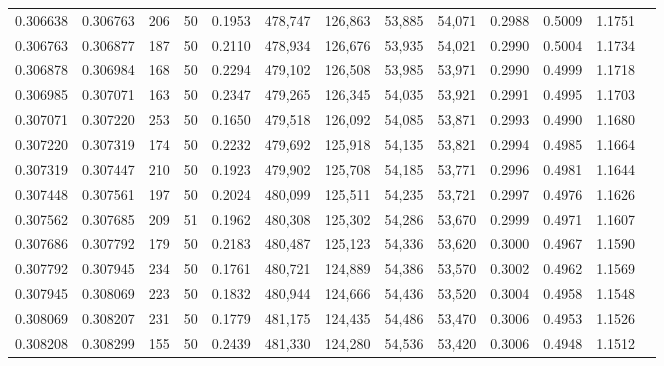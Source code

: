 \begin{tabular}{rrrrrrrrrrrrr}
0.306638 & 0.306763 &   206 &  50 &                                     0.1953 & 478,747 & 126,863 &  53,885 &  54,071 & 0.2988 & 0.5009 & 1.1751 \\
0.306763 & 0.306877 &   187 &  50 &                                     0.2110 & 478,934 & 126,676 &  53,935 &  54,021 & 0.2990 & 0.5004 & 1.1734 \\
0.306878 & 0.306984 &   168 &  50 &                                     0.2294 & 479,102 & 126,508 &  53,985 &  53,971 & 0.2990 & 0.4999 & 1.1718 \\
0.306985 & 0.307071 &   163 &  50 &                                     0.2347 & 479,265 & 126,345 &  54,035 &  53,921 & 0.2991 & 0.4995 & 1.1703 \\
0.307071 & 0.307220 &   253 &  50 &                                     0.1650 & 479,518 & 126,092 &  54,085 &  53,871 & 0.2993 & 0.4990 & 1.1680 \\
0.307220 & 0.307319 &   174 &  50 &                                     0.2232 & 479,692 & 125,918 &  54,135 &  53,821 & 0.2994 & 0.4985 & 1.1664 \\
0.307319 & 0.307447 &   210 &  50 &                                     0.1923 & 479,902 & 125,708 &  54,185 &  53,771 & 0.2996 & 0.4981 & 1.1644 \\
0.307448 & 0.307561 &   197 &  50 &                                     0.2024 & 480,099 & 125,511 &  54,235 &  53,721 & 0.2997 & 0.4976 & 1.1626 \\
0.307562 & 0.307685 &   209 &  51 &                                     0.1962 & 480,308 & 125,302 &  54,286 &  53,670 & 0.2999 & 0.4971 & 1.1607 \\
0.307686 & 0.307792 &   179 &  50 &                                     0.2183 & 480,487 & 125,123 &  54,336 &  53,620 & 0.3000 & 0.4967 & 1.1590 \\
0.307792 & 0.307945 &   234 &  50 &                                     0.1761 & 480,721 & 124,889 &  54,386 &  53,570 & 0.3002 & 0.4962 & 1.1569 \\
0.307945 & 0.308069 &   223 &  50 &                                     0.1832 & 480,944 & 124,666 &  54,436 &  53,520 & 0.3004 & 0.4958 & 1.1548 \\
0.308069 & 0.308207 &   231 &  50 &                                     0.1779 & 481,175 & 124,435 &  54,486 &  53,470 & 0.3006 & 0.4953 & 1.1526 \\
0.308208 & 0.308299 &   155 &  50 &                                     0.2439 & 481,330 & 124,280 &  54,536 &  53,420 & 0.3006 & 0.4948 & 1.1512 \\

\end{tabular}
